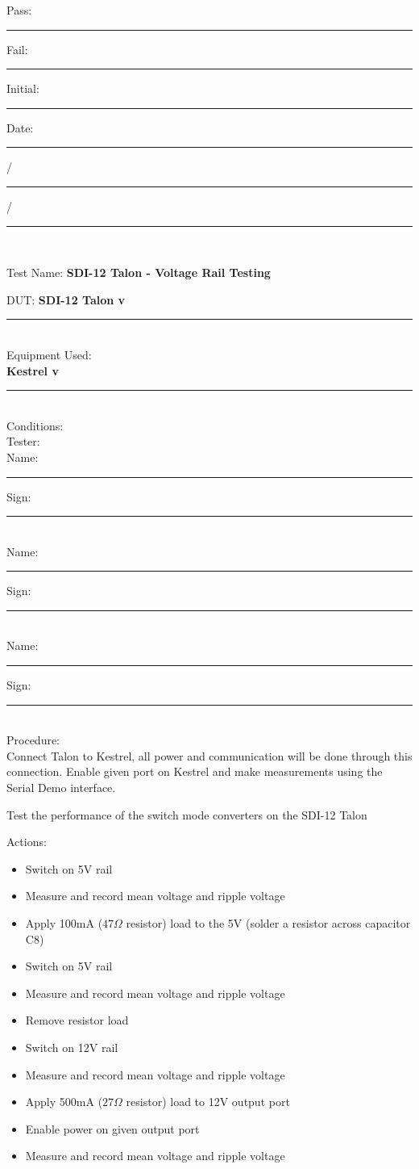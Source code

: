 \vfill
{\large Pass: \rule{1cm}{0.15mm} \hspace{1cm} Fail: \rule{1cm}{0.15mm}} \hfill Initial: \rule{2cm}{0.15mm} \hspace{1cm} Date: \rule{0.5cm}{0.15mm}/\rule{0.5cm}{0.15mm}/\rule{1cm}{0.15mm}\\[5pt]

\pagebreak

{\Huge Test Name: \textbf{SDI-12 Talon - Voltage Rail Testing}}\\[20pt]
{\Large DUT: \textbf{SDI-12 Talon v}\rule{1cm}{0.15mm}} \\[10pt]
{\Large Equipment Used: }\\[5pt]
\textbf{Kestrel v}\rule{1cm}{0.15mm}\\[40pt]
{\Large Conditions: }\\[40pt]
{\Large Tester: }\\[10pt]
Name: \rule{4cm}{0.15mm} \hfill Sign: \rule{4cm}{0.15mm}\\[5pt]
Name: \rule{4cm}{0.15mm} \hfill Sign: \rule{4cm}{0.15mm}\\[5pt]
Name: \rule{4cm}{0.15mm} \hfill Sign: \rule{4cm}{0.15mm}\\[15pt]
{\Large Procedure: }\\
Connect Talon to Kestrel, all power and communication will be done through this connection. Enable given port on Kestrel and make measurements using the Serial Demo interface. 

Test the performance of the switch mode converters on the SDI-12 Talon

{\large Actions:}
\begin{itemize}
\item Switch on 5V rail
\item Measure and record mean voltage and ripple voltage 
\item Apply 100mA ($47\Omega$ resistor) load to the 5V (solder a resistor across capacitor C8)
\item Switch on 5V rail
\item Measure and record mean voltage and ripple voltage 
\item Remove resistor load
\item Switch on 12V rail
\item Measure and record mean voltage and ripple voltage 
\item Apply 500mA ($27\Omega$ resistor) load to 12V output port 
\item Enable power on given output port
\item Measure and record mean voltage and ripple voltage 
\end{itemize}

